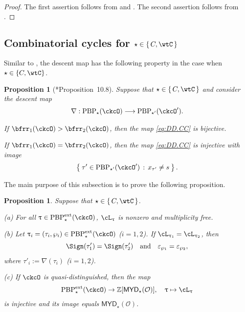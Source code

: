 \documentclass[11pt,a4paper]{amsart}
\def\MYD{{\mathsf{MYD}}}
\newcommand{\CO}{{\mathcal {O}}}
\newcommand{\Z}{\mathbb{Z}}
\def\DD{\nabla}
\numberwithin{equation}{section}
\newtheorem{prop}[thm]{Proposition}
\theoremstyle{remark}
\def\PBPes{\mathrm{PBP}^{\mathrm{ext}}_{\star}}
\def\ckcOp{\ckcO^{\prime}}
\def\PBP{\mathrm{PBP}}
\def\MYD{{\mathsf{MYD}}}
\def\ac{\cL}
\begin{document}
\begin{proof}
 The first assertion follows from    and .
 The second assertion follows from .
 \end{proof}


\subsection{Combinatorial cycles for  $\star\in \set{C,\wtC}$}\label{seccwtc}

Similar to , the descent map has  the following property in the case when $\star\in \{C,\wtC\}$.

\begin{prop}[{\cite{BMSZa}*{Proposition~10.8}}]\label{prop:CC.bij}
Suppose that $\star \in \set{C,\wtC}$ and
consider the descent map
\begin{equation}\label{eq:DD.CC}
\nabla: \PBP_\star(\ckcO)\longrightarrow  \PBP_{\star'}(\ckcOp).
\end{equation}
\begin{enuma}
\item If
 $\bfrr_1(\ckcO)>\bfrr_2(\ckcO)$, then
the map \eqref{eq:DD.CC}  is bijective.

\item If   $\bfrr_1(\ckcO)=\bfrr_2(\ckcO)$,
then the  map \eqref{eq:DD.CC} is injective with image
\[
\Set{\tau'\in \PBP_{\star'}(\ckcOp)\,:\, x_{\tau'}\neq s}.
\]
\end{enuma}
\end{prop}

 The main purpose of this subsection is to prove the following proposition.
\begin{prop}\label{lem:C}
  Suppose that $\star \in \set{C,\wtC}$.

\noindent (a) For all $\uptau\in \PBPes(\ckcO)$, $\ac_\uptau$ is nonzero and multiplicity free.

\noindent (b) Let $\uptau_{i} = (\tau_{i},\wp_{i})\in \PBPes(\ckcO)$ ($i=1,2$). If  $\ac_{\uptau_{1}} =  \ac_{\uptau_{2}}$, then
    \[
      \Sign(\tau'_{1})=\Sign(\tau'_{2}) \quad \text{and} \quad
    \varepsilon_{\wp_{1}}=\varepsilon_{\wp_{2}}, \]
    where $\tau'_{i} :=
    \DD(\tau_{i})$ ($i=1,2$).

    \noindent (c) If $\ckcO$ is quasi-distinguished, then the map \[
    \PBPes(\ckcO)\rightarrow \Z[\MYD_\star(\CO)],\quad \uptau\mapsto \ac_\uptau
    \]
    is injective and its image equals $\MYD_\star(\CO)$.
  \end{prop}
\end{document}
